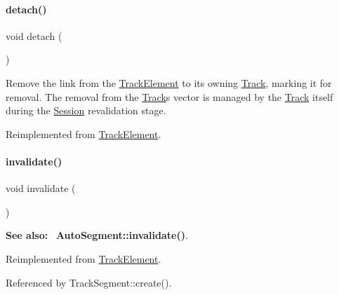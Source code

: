 \paragraph{\texorpdfstring{detach()}{detach()}}
{\footnotesize\ttfamily void detach (\begin{DoxyParamCaption}{ }\end{DoxyParamCaption})\hspace{0.3cm}{\ttfamily [virtual]}}

Remove the link from the \hyperlink{classKite_1_1TrackElement}{Track\+Element} to it\textquotesingle{}s owning \hyperlink{classKite_1_1Track}{Track}, marking it for removal. The removal from the \hyperlink{classKite_1_1Track}{Track}\textquotesingle{}s vector is managed by the \hyperlink{classKite_1_1Track}{Track} itself during the \hyperlink{classKite_1_1Session}{Session} revalidation stage. 

Reimplemented from \hyperlink{classKite_1_1TrackElement_ac295bade8aee589f6718dfa79edc2a34}{Track\+Element}.

\mbox{\label{classKite_1_1TrackSegment_a893f1101c650c08c98612515c2b1a89c}} 
\paragraph{\texorpdfstring{invalidate()}{invalidate()}}
{\footnotesize\ttfamily void invalidate (\begin{DoxyParamCaption}{ }\end{DoxyParamCaption})\hspace{0.3cm}{\ttfamily [virtual]}}

{\bfseries See also\+:}~ \textbf{ Auto\+Segment\+::invalidate()}. 

Reimplemented from \hyperlink{classKite_1_1TrackElement_a893f1101c650c08c98612515c2b1a89c}{Track\+Element}.



Referenced by Track\+Segment\+::create().

\mbox{\label{classKite_1_1TrackSegment_a5bd93abe1416952ace15a98dbeeed124}} 
